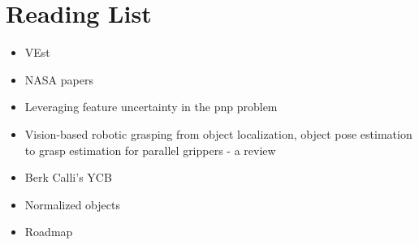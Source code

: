 \documentclass[11pt]{article}
\begin{document}
\section{Reading List}
\begin{itemize}
      \item VEst \cite{5160698}
      \item NASA papers \cite{NASATech44:online}
      \item Leveraging feature uncertainty in the pnp problem \cite{ferraz2014leveraging}
      \item Vision-based robotic grasping from object localization, object pose
      estimation to grasp estimation for parallel grippers - a review \cite{du2020vision}
      \item Berk Calli's YCB \cite{calli2015ycb}
      \item Normalized objects \cite{Wang_2019_CVPR}
      \item Roadmap \cite{roadmap251:online}

\end{itemize}
\end{document}
